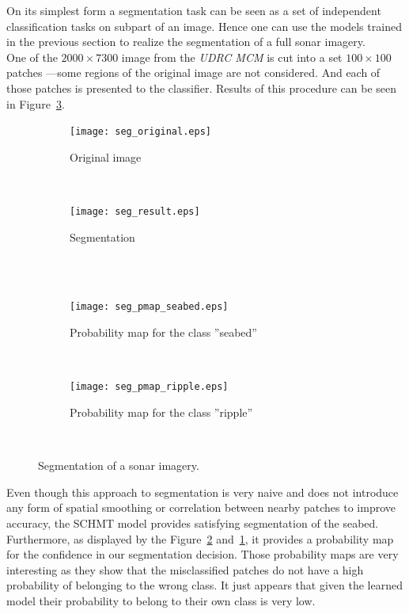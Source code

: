 \documentclass[a4paper,11pt]{report}
\begin{document}
		On its simplest form  a segmentation task can be seen as a set of independent classification tasks on subpart of an image. Hence one can use the models trained in the previous section to realize the segmentation of a full sonar imagery.\\
		
		One of the  $2000 \times 7300$ image from the \textit{UDRC MCM} is cut into a set $100 \times 100$ patches ---some regions of the original image are not considered. And each of those patches is presented to the classifier. Results of this procedure can be seen in Figure~\ref{fig:Segmentation}.\\

		\begin{figure}[h]
			\centering
			\begin{subfigure}[t]{0.48\textwidth}
				\centering
				\texttt{[image: seg\_original.eps]}
				\caption{Original image}
			\end{subfigure}%
			~ 
			\begin{subfigure}[t]{0.48\textwidth}
        \centering
        \texttt{[image: seg\_result.eps]}
        \caption{Segmentation}
			\end{subfigure}
			\\
			~
			\begin{subfigure}[t]{0.48\textwidth}
        \centering
        \texttt{[image: seg\_pmap\_seabed.eps]}
        \caption{Probability map for the class ''seabed''}
        \label{subfig:seg_pmap_seabed}
			\end{subfigure}
			~
			\begin{subfigure}[t]{0.48\textwidth}
        \centering
        \texttt{[image: seg\_pmap\_ripple.eps]}
        \caption{Probability map for the class ''ripple''}
        \label{subfig:seg_pmap_ripple}
			\end{subfigure}
			~
			\caption{Segmentation of a sonar imagery.}
			\label{fig:Segmentation}
		\end{figure}
		
		Even though this approach to segmentation is very naive and does not introduce any form of spatial smoothing or correlation between nearby patches to improve accuracy, the SCHMT model provides satisfying segmentation of the seabed. Furthermore, as displayed by the Figure~\ref{subfig:seg_pmap_ripple} and~\ref{subfig:seg_pmap_seabed}, it provides a probability map for the confidence in our segmentation decision. Those probability maps are very interesting as they show that the misclassified patches do not have a high probability of belonging to the wrong class. It just appears that given the learned model their probability to belong to their own class is very low. %
		
\end{document}
